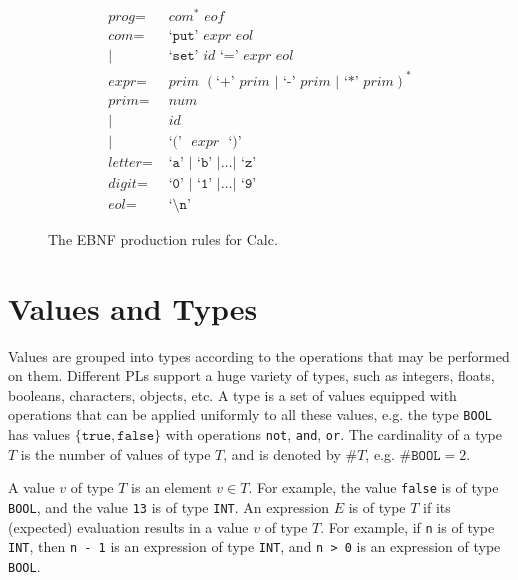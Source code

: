 \documentclass[a4paper, openany]{memoir}
\begin{document}
\begin{figure}[H]
    \begin{align*}
        \textit{prog} =& \textit{ com}^{\texttt{*}}  \textit{ eof} \\
        \textit{com} =& \text{ `}\texttt{put}\text{' } \textit{expr eol} \\
        |\hspace{2pt} & \text{ `}\texttt{set}\text{' } \textit{id } \text{`}\texttt{=}\text{'} \textit{ expr eol} \\
        \textit{expr} =& \textit{  prim } (\text{`}\texttt{+}\text{'} \textit{ prim }|\text{ `}\texttt{-}\text{'} \textit{ prim }|\text{ `}\texttt{*}\text{'} \textit{ prim})^{\texttt{*}} \\
        \textit{prim} =& \textit{ num} \\
        |\hspace{2pt} & \textit{ id} \\
        |\hspace{2pt} & \text{ `}\texttt{(}\text{' } \textit{ expr } \text{ `}\texttt{)}\text{'} \\
        \textit{letter} =& \text{ `}\texttt{a}\text{' } | \text{ `}\texttt{b}\text{' } | \dots | \text{ `}\texttt{z}\text{' } \\
        \textit{digit} =& \text{ `}\texttt{0}\text{' } | \text{ `}\texttt{1}\text{' } | \dots | \text{ `}\texttt{9}\text{'} \\
        \textit{eol} =& \text{ `}\texttt{\textbackslash n}\text{'}
    \end{align*}
    \caption{The EBNF production rules for Calc.}
\end{figure}

\newpage

\section{Values and Types}
Values are grouped into types according to the operations that may be performed on them. Different PLs support a huge variety of types, such as integers, floats, booleans, characters, objects, etc. A type is a set of values equipped with operations that can be applied uniformly to all these values, e.g. the type \texttt{BOOL} has values $\{\texttt{true}, \texttt{false}\}$ with operations \texttt{not}, \texttt{and}, \texttt{or}. The cardinality of a type $T$ is the number of values of type $T$, and is denoted by $\#T$, e.g. $\#\texttt{BOOL} = 2$.

A value $v$ of type $T$ is an element $v \in T$. For example, the value \texttt{false} is of type \texttt{BOOL}, and the value \texttt{13} is of type \texttt{INT}. An expression $E$ is of type $T$ if its (expected) evaluation results in a value $v$ of type $T$. For example, if \texttt{n} is of type \texttt{INT}, then \texttt{n - 1} is an expression of type \texttt{INT}, and \texttt{n > 0} is an expression of type \texttt{BOOL}.
\end{document}
